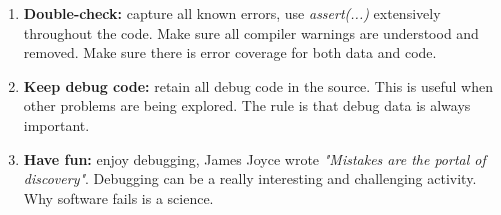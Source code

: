 \begin{enumerate}
\item \textbf{Double-check:} capture all known errors, use \textit{assert(...)} extensively throughout the code. Make sure all compiler warnings are understood and removed. Make sure there is error coverage for both data and code.

\item \textbf{Keep debug code:} retain all debug code in the source. This is useful when other problems are being explored. The rule is that debug data is always important.

\item \textbf{Have fun:} enjoy debugging, James Joyce wrote \textit{"Mistakes are the portal of discovery"}. Debugging can be a really interesting and challenging activity. Why software fails is a science.

\end{enumerate}

